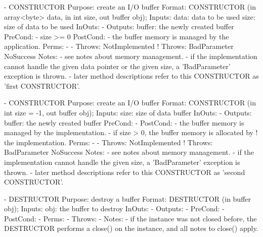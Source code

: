  \begin{myspec}
    - CONSTRUCTOR
      Purpose:  create an I/O buffer
      Format:   CONSTRUCTOR          (in  array<byte> data,
                                      in  int         size,
                                      out buffer      obj);
      Inputs:   data:                 data to be used
                size:                 size of data to be used
      InOuts:   -
      Outputs:  buffer:               the newly created buffer
      PreCond:  - size >= 0
      PostCond: - the buffer memory is managed by the
                  application.
      Perms:    -
-     Throws:   NotImplemented
!     Throws:   BadParameter
                NoSuccess
      Notes:    - see notes about memory management.
                - if the implementation cannot handle the 
                  given data pointer or the given size, a 
                  'BadParameter' exception is thrown.
                - later method descriptions refer to this
                  CONSTRUCTOR as 'first CONSTRUCTOR'.
 
 
    - CONSTRUCTOR
      Purpose:  create an I/O buffer
      Format:   CONSTRUCTOR          (in  int         size = -1,
                                      out buffer      obj);
      Inputs:   size:                 size of data buffer
      InOuts:   -
      Outputs:  buffer:               the newly created buffer
      PreCond:  -
      PostCond: - the buffer memory is managed by the
                  implementation.
                - if size > 0, the buffer memory is allocated by
!                 the implementation.
      Perms:    -
-     Throws:   NotImplemented
!     Throws:   BadParameter
                NoSuccess
      Notes:    - see notes about memory management.
                - if the implementation cannot handle the 
                  given size, a 'BadParameter' exception is 
                  thrown.
                - later method descriptions refer to this
                  CONSTRUCTOR as 'second CONSTRUCTOR'.
 
 
    - DESTRUCTOR
      Purpose:  destroy a buffer
      Format:   DESTRUCTOR           (in  buffer obj);
      Inputs:   obj:                  the buffer to destroy
      InOuts:   -
      Outputs:  -
      PreCond:  -
      PostCond: -
      Perms:    -
      Throws:   -
      Notes:    - if the instance was not closed before, the 
                  DESTRUCTOR performs a close() on the instance,
                  and all notes to close() apply.
 

\end{myspec}

